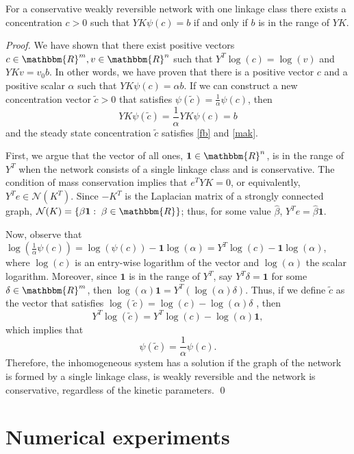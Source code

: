\documentclass[smallextended]{svjour3}       %
\newcommand*{\0}{\mathbf{0}}
\newcommand*{\1}{\mathbf{1}}
\newcommand*{\R}{\mathbbm{R}}
\begin{document}
\begin{theorem}\label{thm:scaling}
	For a conservative weakly reversible network with one linkage class there exists a
	concentration $c>0$ such that $YK\psi(c) = b$ if and only if $b$ is in the
	range of $YK$. 
\end{theorem}

\begin{proof}
	We have shown that there exist positive vectors $c \in \R^m, v \in \R^n$ such
	that $Y^T \log(c) = \log (v)$ and $Y K v = v_0 b$.  In other words, we have
	proven that there is a positive vector $c$ and a positive scalar $\alpha$
	such that $Y K \psi(c) = \alpha b$.  If we can construct a new
	concentration vector $\tilde c > 0$ that satisfies $\psi(\tilde c) =
	\frac{1}{\alpha}\psi(c)$, then
	\[
		YK\psi(\tilde c) = \frac{1}{\alpha}YK\psi(c) = b
	\]
	and the steady state concentration $\tilde c$ satisfies \eqref{fb} and
	\eqref{mak}.  

	First, we argue that the vector of all ones, $\1 \in \R^n$, is in the range
	of $Y^T$ when the network consists of a single linkage class and
	is conservative. The condition of mass conservation implies that $e^T Y K = 0$, 
	or equivalently, $Y^T e \in \mathcal{N} (K^T)$.  Since $-K^T$ is the 
	Laplacian matrix of a strongly connected graph, $\mathcal{N}(K) = \{\beta
	\1 :\; \beta \in \R\}$; thus, for some value $\hat \beta$, $Y^T e = \hat\beta
	\1$. 
	
	Now, observe that $\log\left(\frac{1}{\alpha}\psi(c) \right) =
	\log(\psi(c))-\1\log(\alpha) = Y^T\log(c) - \1\log(\alpha)$, where $\log(c)$
	is an entry-wise logarithm of the vector and $\log(\alpha)$ the scalar
	logarithm. Moreover, since $\1$ is in the range of $Y^T$, say $Y^T \delta =
	\1$ for some $\delta \in \R^m$, then $\log(\alpha)\1 =
	Y^T(\log(\alpha)\delta)$. Thus, if we define $\tilde c$ as the vector that
	satisfies  $\log(\tilde c) = \log(c) - \log(\alpha)\delta$ , then 
	\[
	Y^T\log(\tilde c) = Y^T\log(c) - \log(\alpha)\1,
	\] 
	which implies that 
	\[
	\psi(\tilde c) = \frac{1}{\alpha}\psi(c).
	\] 
	Therefore, the inhomogeneous system has a solution if the graph of
	the network is formed by a single linkage class, is weakly reversible
    and the network is conservative, regardless of the kinetic parameters.
   \qed
\end{proof}


\section{Numerical experiments}
\label{sec:experiments}
\end{document}
